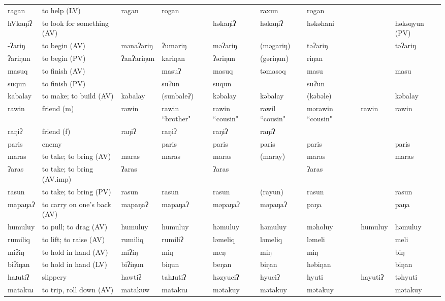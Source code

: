 \begin{landscape}
\begin{longtable}{*{9}{>{\raggedright\arraybackslash}p{}}}
\text{*}ragan & to help (LV) & ragan & rogan &  & raxun & rogan &  & \\
\text{*}hVkaŋiʔ & to look for something (AV) &  &  & həkaŋiʔ & həkaŋiʔ & həkəhani &  & həkəŋyun (PV)\\
\text{*}-ʔariŋ & to begin (AV) & mənaʔariŋ & ʔumariŋ & məʔariŋ & (məgariŋ) & təʔariŋ &  & təʔariŋ\\
\text{*}ʔariŋun & to begin (PV) & ʔanʔariŋun & kariŋan & ʔəriŋun & (gəriŋun) & riŋan &  & \\
\text{*}masuq & to finish (AV) &  & masuʔ & masuq & təmasoq & masu &  & masu\\
\text{*}suqun & to finish (PV) &  & suʔun & suqun &  & suʔun &  & \\
\text{*}kabalay & to make; to build (AV) & kabalay & (sunbaleʔ) & kəbalay & kəbalay & (kəbəle) &  & kəbalay\\
\text{*}rawin & friend (m) & rawin & rawin ``brother" & rawin ``cousin" & rawil \newline ``cousin" & mərawin ``cousin" & rawin & rawin\\
\text{*}raŋiʔ & friend (f) & raŋiʔ & raŋiʔ & raŋiʔ & raŋiʔ &  &  & \\
\text{*}paris & enemy &  & paris & paris & paris & paris &  & paris\\
\text{*}maras & to take; to bring (AV) & maras & maras & maras & (maray) & maras &  & maras\\
\text{*}ʔaras & to take; to bring (AV.imp) & ʔaras &  & ʔaras &  & ʔaras &  & \\
\text{*}rasun & to take; to bring (PV) & rasun & rasun & rasun & (rayun) & rasun &  & rasun\\
\text{*}mapaŋaʔ & to carry on one's back (AV) & mapaŋaʔ & mapaŋaʔ & məpaŋaʔ & məpaŋaʔ & paŋa &  & paŋa\\
\text{*}humuluy & to pull; to drag (AV) & humuluy & humuluy & həmuluy & həmuluy & məholuy & humuluy & həmuluy\\
\text{*}rumiliq & to lift; to raise (AV) & rumiliq & rumiliʔ & ləmeliq & ləmeliq & ləmeli &  & meli\\
\text{*}miʔiŋ & to hold in hand (AV) & miʔiŋ & miŋ & meŋ & miŋ & miŋ &  & biŋ\\
\text{*}biʔiŋan & to hold in hand (LV) & biʔiŋun & biŋun & beŋan & biŋan & həbiŋan &  & biŋan\\
\text{*}haɹutiʔ & slippery & hawtiʔ & tahɹutiʔ & həzyuciʔ & hyuciʔ & hyuti & hayutiʔ & təhyuti\\
\text{*}matakuɹ & to trip, roll down (AV) & matakuw & matakuɹ & mətakuy & mətakuy & mətakuy &  & mətakuy\\

\end{longtable}
\end{landscape}
